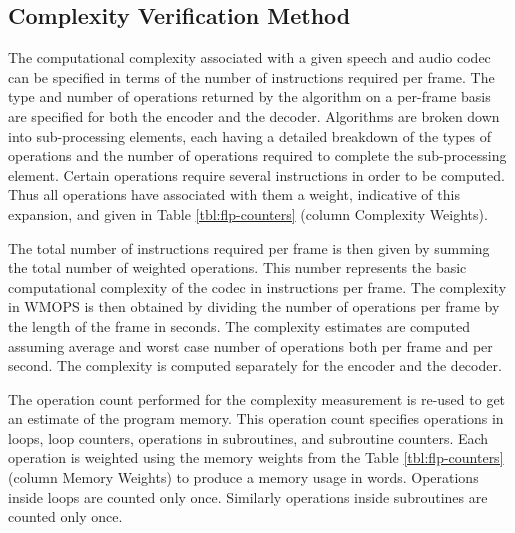 \subsection{Complexity Verification Method}
The computational complexity associated with a given speech and audio
codec can be specified in terms of the number of instructions required
per frame. The type and number of operations returned by the algorithm
on a per-frame basis are specified for both the encoder and the
decoder. Algorithms are broken down into sub-processing elements, each
having a detailed breakdown of the types of operations and the number
of operations required to complete the sub-processing element. Certain
operations require several instructions in order to be computed. Thus
all operations have associated with them a weight, indicative of this
expansion, and given in Table \ref{tbl:flp-counters} (column
Complexity Weights).

The total number of instructions required per frame is then given by
summing the total number of weighted operations. This number represents
the basic computational complexity of the codec in instructions per
frame. The complexity in WMOPS is then obtained by dividing the number
of operations per frame by the length of the frame in seconds. The
complexity estimates are computed assuming average and worst case
number of operations both per frame and per second. The complexity
is computed separately for the encoder and the decoder.

The operation count performed for the complexity measurement is re-used
to get an estimate of the program memory. This operation count specifies
operations in loops, loop counters, operations in subroutines, and
subroutine counters. Each operation is weighted using the memory weights
from the Table \ref{tbl:flp-counters} (column Memory Weights) to produce
a memory usage in words. Operations inside loops are counted only once.
Similarly operations inside subroutines are counted only once.

